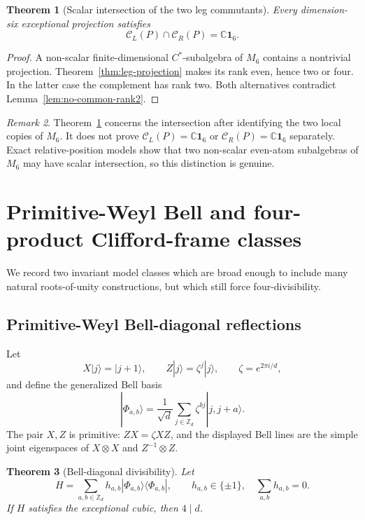 \documentclass[11pt]{article}
\newtheorem{theorem}{Theorem}[section]
\theoremstyle{definition}
\theoremstyle{remark}
\newtheorem{remark}[theorem]{Remark}
\newcommand{\Id}{\mathbf 1}
\newcommand{\bbC}{\mathbb C}
\newcommand{\cC}{\mathcal C}
\begin{document}
\begin{theorem}[Scalar intersection of the two leg commutants]
\label{thm:common-leg}
Every dimension-six exceptional projection satisfies
\[
  \boxed{\cC_L(P)\cap\cC_R(P)=\bbC\Id_6.}
\]
\end{theorem}

\begin{proof}
A non-scalar finite-dimensional \(C^*\)-subalgebra of \(M_6\) contains a
nontrivial projection. Theorem~\ref{thm:leg-projection} makes its rank
even, hence two or four. In the latter case the complement has rank two.
Both alternatives contradict Lemma~\ref{lem:no-common-rank2}.
\end{proof}

\begin{remark}
Theorem~\ref{thm:common-leg} concerns the intersection after identifying
the two local copies of \(M_6\). It does not prove
\(\cC_L(P)=\bbC\Id_6\) or \(\cC_R(P)=\bbC\Id_6\) separately.
Exact relative-position models show that two non-scalar even-atom
subalgebras of \(M_6\) may have scalar intersection, so this distinction
is genuine.
\end{remark}

\section{Primitive-Weyl Bell and four-product Clifford-frame classes}
\label{sec:model-classes}

We record two invariant model classes which are broad enough to include
many natural roots-of-unity constructions, but which still force
four-divisibility.

\subsection{Primitive-Weyl Bell-diagonal reflections}

Let
\[
 X|j\rangle=|j+1\rangle,\qquad
 Z|j\rangle=\zeta^j|j\rangle,\qquad
 \zeta=e^{2\pi i/d},
\]
and define the generalized Bell basis
\[
 |\Phi_{a,b}\rangle
 =
 \frac1{\sqrt d}\sum_{j\in\mathbb Z_d}
 \zeta^{bj}|j,j+a\rangle.
\]
The pair \(X,Z\) is primitive: \(ZX=\zeta XZ\), and the displayed Bell
lines are the simple joint eigenspaces of \(X\otimes X\) and
\(Z^{-1}\otimes Z\).

\begin{theorem}[Bell-diagonal divisibility]\label{thm:bell}
Let
\[
 H=\sum_{a,b\in\mathbb Z_d}
 h_{a,b}|\Phi_{a,b}\rangle\langle\Phi_{a,b}|,
 \qquad h_{a,b}\in\{\pm1\},\quad
 \sum_{a,b}h_{a,b}=0.
\]
If \(H\) satisfies the exceptional cubic, then \(4\mid d\).
\end{theorem}
\end{document}

